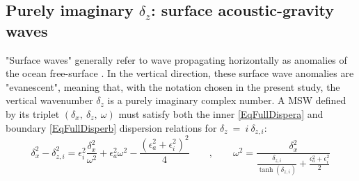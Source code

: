 \subsection{Purely imaginary $\delta_z$: surface acoustic-gravity waves}
\label{SubSectionGraphicMSW}
"Surface waves" generally refer to wave propagating horizontally as anomalies of the ocean free-surface \citep{gill_1982}. In the vertical direction, these surface wave anomalies are "evanescent", meaning that, with the notation chosen in the present study, the vertical wavenumber $\delta_z$ is a purely imaginary complex number.
A MSW defined by its triplet $(\delta_x,\ \delta_z,\ \omega)$ must satisfy both the inner \ref{EqFullDispera} and boundary \ref{EqFullDisperb} dispersion relations for $\delta_z\ =\ i\ \delta_{z,i}$:
\begin{equation}
\delta_x^2-\delta_{z,i}^2 =\epsilon_i^2\frac{\delta_x^2}
{\omega^2}+\epsilon_a^2\omega^2-\frac{(\epsilon_a^2+\epsilon_i^2)^2}{4} \qquad , \qquad
\omega^2=\frac{\delta_x^2}
{\frac{\delta_{z,i}}{\tanh(\delta_{z,i})}+\frac{\epsilon_a^2+\epsilon_i^2}{2}}
\label{rappel-eqs-complex}
\end{equation}
